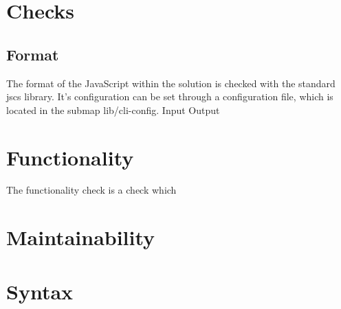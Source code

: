 % 

\section{Checks}

\subsection{Format}

The format of the JavaScript within the solution is checked with the standard jscs library.
It's configuration can be set through a configuration file, which is located in the submap lib/cli-config.
{Input}
{Output}



\section{Functionality}

The functionality check is a check which 


\section{Maintainability}


\section{Syntax}


